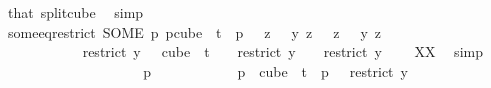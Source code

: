 \begin{isabellebody}
\ that\ split{\isacharunderscore}{\kern0pt}cube\ \isamarkupfalse%
\ simp\isanewline
\isanewline
\ \ \ \ \ \ \ \ \isamarkupfalse%
\ some{\isacharunderscore}{\kern0pt}eq{\isacharunderscore}{\kern0pt}restrict{\isacharcolon}{\kern0pt}\ {\isachardoublequoteopen}{\isacharparenleft}{\kern0pt}SOME\ p{\isachardot}{\kern0pt}\ p{\isasymin}cube\ {}\ {\isacharparenleft}{\kern0pt}t{\isacharplus}{\kern0pt}{}{\isacharparenright}{\kern0pt}\ {\isasymand}\ p\ {}\ {\isacharequal}{\kern0pt}\ {\isacharparenleft}{\kern0pt}{\isacharparenleft}{\kern0pt}{\isasymlambda}z\ {\isasymin}\ {\isacharbraceleft}{\kern0pt}{\isachardot}{\kern0pt}{\isachardot}{\kern0pt}{\isacharless}{\kern0pt}{}{\isacharbraceright}{\kern0pt}{\isachardot}{\kern0pt}\ y\ z{\isacharparenright}{\kern0pt}\ {}{\isacharparenright}{\kern0pt}{\isacharparenright}{\kern0pt}\ {\isacharequal}{\kern0pt}\ {\isacharparenleft}{\kern0pt}{\isasymlambda}z\ {\isasymin}\ {\isacharbraceleft}{\kern0pt}{\isachardot}{\kern0pt}{\isachardot}{\kern0pt}{\isacharless}{\kern0pt}{}{\isacharbraceright}{\kern0pt}{\isachardot}{\kern0pt}\ y\ z{\isacharparenright}{\kern0pt}{\isachardoublequoteclose}\isanewline
\ \ \ \ \ \ \ \ \isamarkupfalse%
\ \isanewline
\ \ \ \ \ \ \ \ \ \ \isamarkupfalse%
\ {\isachardoublequoteopen}restrict\ y\ {\isacharbraceleft}{\kern0pt}{\isachardot}{\kern0pt}{\isachardot}{\kern0pt}{\isacharless}{\kern0pt}{}{\isacharbraceright}{\kern0pt}\ {\isasymin}\ cube\ {}\ {\isacharparenleft}{\kern0pt}t\ {\isacharplus}{\kern0pt}\ {}{\isacharparenright}{\kern0pt}\ {\isasymand}\ restrict\ y\ {\isacharbraceleft}{\kern0pt}{\isachardot}{\kern0pt}{\isachardot}{\kern0pt}{\isacharless}{\kern0pt}{}{\isacharbraceright}{\kern0pt}\ {}\ {\isacharequal}{\kern0pt}\ restrict\ y\ {\isacharbraceleft}{\kern0pt}{\isachardot}{\kern0pt}{\isachardot}{\kern0pt}{\isacharless}{\kern0pt}{}{\isacharbraceright}{\kern0pt}\ {}{\isachardoublequoteclose}\ \isamarkupfalse%
\ XX\ \isamarkupfalse%
\ simp\isanewline
\ \ \ \ \ \ \ \ \isamarkupfalse%
\isanewline
\ \ \ \ \ \ \ \ \ \ \isamarkupfalse%
\ p\isanewline
\ \ \ \ \ \ \ \ \ \ \isamarkupfalse%
\ {\isachardoublequoteopen}p\ {\isasymin}\ cube\ {}\ {\isacharparenleft}{\kern0pt}t{\isacharplus}{\kern0pt}{}{\isacharparenright}{\kern0pt}\ {\isasymand}\ p\ {}\ {\isacharequal}{\kern0pt}\ restrict\ y\ {\isacharbraceleft}{\kern0pt}{\isachardot}{\kern0pt}{\isachardot}{\kern0pt}{\isacharless}{\kern0pt}{}{\isacharbraceright}{\kern0pt}\ {}{\isachardoublequoteclose}\isanewline

\end{isabellebody}
